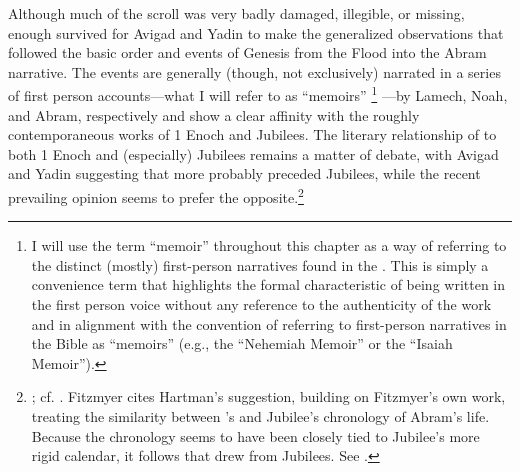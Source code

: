 Although much of the scroll was very badly damaged, illegible, or missing, enough survived for Avigad and Yadin to make the generalized observations that \ga followed the basic order and events of Genesis from the Flood into the Abram narrative. The events are generally (though, not exclusively) narrated in a series of first person accounts---what I will refer to as ``memoirs''%
%
\footnote{I will use the term ``memoir'' throughout this chapter as a way of referring to the distinct (mostly) first-person narratives found in the \ga. This is simply a convenience term that highlights the formal characteristic of being written in the first person voice without any reference to the authenticity of the work and in alignment with the convention of referring to first-person narratives in the Bible as ``memoirs'' (e.g., the ``Nehemiah Memoir'' or the ``Isaiah Memoir'').}%
---by Lamech, Noah, and Abram, respectively and show a clear affinity with the roughly contemporaneous works of 1 Enoch and Jubilees.\autocite[16--37]{avigad-yadin1956} The literary relationship of \ga to both 1 Enoch and (especially) Jubilees remains a matter of debate, with Avigad and Yadin suggesting that \ga more probably preceded Jubilees, while the recent prevailing opinion seems to prefer the opposite.\footnote{\cite[38]{avigad-yadin1956}; cf. \cite[20--21]{fitzmyer2004}. Fitzmyer cites Hartman's suggestion, building on Fitzmyer's own work, treating the similarity between \ga's and Jubilee's chronology of Abram's life. Because the chronology seems to have been closely tied to Jubilee's more rigid calendar, it follows that \ga drew from Jubilees. See \cite[497]{hartman_cbq1966}.}

